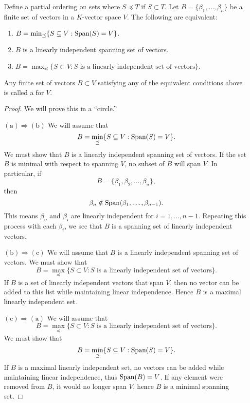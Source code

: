 \documentclass{ximera}
\begin{document}
\begin{theorem}
  Define a partial ordering on sets where $S \preceq T$ if $S\subset
  T$. Let $B= \{\beta_1,\dots,\beta_n\}$ be a finite set of vectors in
  a $K$-vector space $V$. The following are equivalent:
  \begin{enumerate}
  \item $B = \min_{\preceq}\{S\subseteq V:\operatorname{Span}(S) = V\}$.
  \item $B$ is a linearly independent spanning set of vectors.
  \item $B = \max_{\preceq}\{S\subset V:\text{$S$ is a linearly independent set of vectors}\}$.
  \end{enumerate}
  Any finite set of vectors $B \subset V$ satisfying any of the
  equivalent conditions above is called a  for $V$.
  \begin{proof}
    We will prove this in a ``circle.''


    $(\mathrm a)\Rightarrow(\mathrm b)$ We will assume that
    \[
    B = \min_{\preceq}\{S\subseteq V:\operatorname{Span}(S) = V\}.
    \]
    We must show that $B$ is a linearly independent spanning set of
    vectors.  If the set $B$ is minimal with respect to spanning $V$,
    no subset of $B$ will span $V$. In particular, if
    \[
    B = \{\beta_1,\beta_2,\dots,\beta_n\},
    \]
    then
    \[
    \beta_n \notin \operatorname{Span}(\beta_1,\dots,\beta_{n-1}).
    \]
    This means $\beta_n$ and $\beta_i$ are linearly independent for $i
    = 1,\dots, n-1$. Repeating this process with each $\beta_i$, we
    see that $B$ is a spanning set of linearly independent vectors.


    $(\mathrm b)\Rightarrow(\mathrm c)$ We will assume that $B$ is a
    linearly independent spanning set of vectors. We must show that
    \[
    B = \max_{\preceq}\{S\subset V:\text{$S$ is a linearly independent set of vectors}\}.
    \]
    If $B$ is a set of linearly independent vectors that span $V$,
    then no vector can be added to this list while maintaining linear
    independence. Hence $B$ is a maximal linearly independent set.
    

    $(\mathrm c)\Rightarrow(\mathrm a)$ We will assume that
    \[
    B = \max_{\preceq}\{S\subset V:\text{$S$ is a linearly independent set of vectors}\}.
    \]
    We must show that
    \[
    B = \min_{\preceq}\{S\subseteq V:\operatorname{Span}(S) = V\}.
    \]
    If $B$ is a maximal linearly independent set, no vectors can be
    added while maintaining linear independence, thus $\operatorname{Span}(B) =
    V$. If any element were removed from $B$, it would no longer span
    $V$, hence $B$ is a minimal spanning set.
  \end{proof}
\end{theorem}
\end{document}
